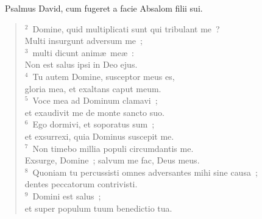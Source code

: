 ~\lettrine[lines=10,image=true,loversize=0.05,lraise=-0.03]{P}{}salmus David, cum fugeret a facie Absalom filii sui.
\begin{flushleft}\begin{verse}\vspace{6pt}${}^{2}$~Domine, quid multiplicati sunt qui tribulant me~?\\ Multi insurgunt adversum me~;\\
${}^{3}$~multi dicunt anim\ae\ me\ae~:\\ Non est salus ipsi in Deo ejus.\\
${}^{4}$~Tu autem Domine, susceptor meus es,\\ gloria mea, et exaltans caput meum.\\
${}^{5}$~Voce mea ad Dominum clamavi~;\\ et exaudivit me de monte sancto suo.\\
${}^{6}$~Ego dormivi, et soporatus sum~;\\ et exsurrexi, quia Dominus suscepit me.\\
${}^{7}$~Non timebo millia populi circumdantis me.\\ Exsurge, Domine~; salvum me fac, Deus meus.\\
${}^{8}$~Quoniam tu percussisti omnes adversantes mihi sine causa~;\\ dentes peccatorum contrivisti.\\
${}^{9}$~Domini est salus~;\\ et super populum tuum benedictio tua.\end{verse}\end{flushleft}


